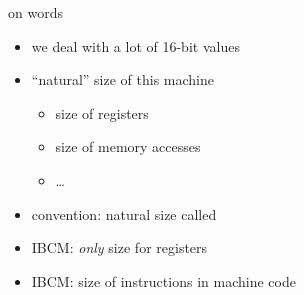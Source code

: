 \begin{frame}{on words}
    \begin{itemize}
    \item we deal with a lot of 16-bit values
    \item ``natural'' size of this machine
            \begin{itemize}
            \item size of registers
            \item size of memory accesses
            \item \ldots
            \end{itemize}
    \vspace{.5cm}
    \item convention: natural size called 
    \vspace{.5cm}
    \item IBCM: \textit{only} size for registers
    \item IBCM: size of instructions in machine code
    \end{itemize}
\end{frame}

